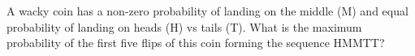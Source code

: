 A wacky coin has a non-zero probability of landing on the middle (M) and equal probability of landing on heads (H) vs tails (T). What is the maximum probability of the first five flips of this coin forming the sequence HMMTT?